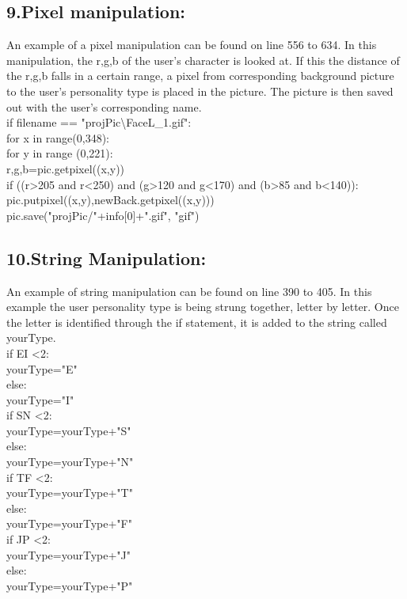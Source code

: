 \documentclass[11pt]{article}%
\begin{document}
\subsection*{9.Pixel manipulation:}
An example of a pixel manipulation can be found on line 556 to 634. In this manipulation, the r,g,b of the user’s character is looked at. If this the distance of the r,g,b falls in a certain range, a pixel from corresponding background picture to the user’s personality type is placed in the picture. The picture is then saved out with the user’s corresponding name.\\
\indent if filename == "projPic\textbackslash FaceL\_1.gif": \\
\indent \indent for x in range(0,348):\\
\indent \indent \indent for y in range (0,221):\\
\indent \indent \indent \indent r,g,b=pic.getpixel((x,y))\\
\indent \indent \indent \indent if ((r\textgreater205 and r\textless250) and (g\textgreater120 and g\textless170) and (b\textgreater85 and b\textless140)):\\
\indent \indent \indent \indent \indent pic.putpixel((x,y),newBack.getpixel((x,y)))\\
\indent\indent pic.save("projPic/"+info[0]+".gif", "gif")
 
\subsection*{10.String Manipulation:}
An example of string manipulation can be found on line 390 to 405. In this example the user personality type is being strung together, letter by letter. Once the letter is identified through the if statement, it is added to the string called yourType.\\
\indent if EI \textless 2:\\
\indent \indent yourType="E"\\
\indent else:\\
\indent \indent yourType="I"\\
\indent if SN \textless 2:\\
\indent \indent yourType=yourType+"S"\\
\indent else:\\
\indent \indent yourType=yourType+"N"\\
\indent if TF \textless 2:\\
\indent \indent yourType=yourType+"T"\\
\indent else:\\
\indent \indent yourType=yourType+"F"\\
\indent if JP \textless 2:\\
\indent \indent yourType=yourType+"J"\\
\indent else:\\
\indent \indent yourType=yourType+"P"
 
\end{document}
